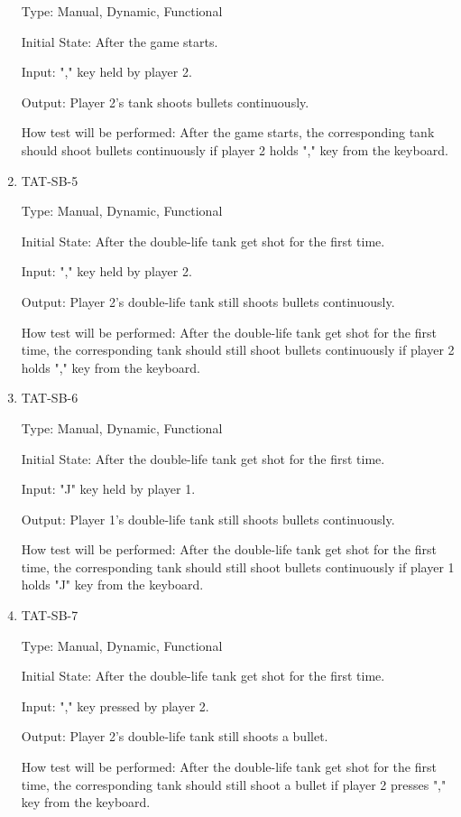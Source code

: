 \documentclass[12pt, titlepage]{article}
\begin{document}
\begin{enumerate}
Type: Manual, Dynamic, Functional
					
Initial State: After the game starts.
					
Input: "," key held by player 2.
					
Output: Player 2's tank shoots bullets continuously. 
					
How test will be performed: After the game starts, the corresponding tank should shoot bullets continuously if player 2 holds "," key from the keyboard.

\item{TAT-SB-5\\}

Type: Manual, Dynamic, Functional
					
Initial State: After the double-life tank get shot for the first time.
					
Input: "," key held by player 2.
					
Output: Player 2's double-life tank still shoots bullets continuously.
					
How test will be performed: After the double-life tank get shot for the first time, the corresponding tank should still shoot bullets continuously if player 2 holds "," key from the keyboard.

\item{TAT-SB-6\\}

Type: Manual, Dynamic, Functional
					
Initial State: After the double-life tank get shot for the first time.
					
Input: "J" key held by player 1.
					
Output: Player 1's double-life tank still shoots bullets continuously.
					
How test will be performed: After the double-life tank get shot for the first time, the corresponding tank should still shoot bullets continuously if player 1 holds "J" key from the keyboard.

\item{TAT-SB-7\\}

Type: Manual, Dynamic, Functional
					
Initial State: After the double-life tank get shot for the first time.
					
Input: "," key pressed by player 2.
					
Output: Player 2's double-life tank still shoots a bullet.
					
How test will be performed: After the double-life tank get shot for the first time, the corresponding tank should still shoot a bullet if player 2 presses "," key from the keyboard.


\end{enumerate}
\end{document}
